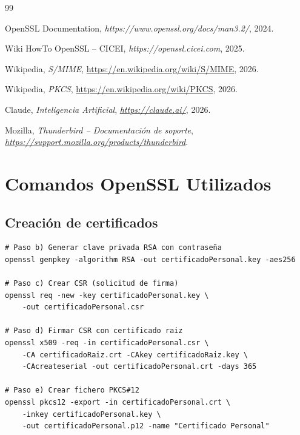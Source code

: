 \documentclass[12pt,a4paper]{report}
\begin{document}
\begin{thebibliography}{99}

 OpenSSL Documentation, \textit{https://www.openssl.org/docs/man3.2/}, 2024.

 Wiki HowTo OpenSSL -- CICEI, \textit{https://openssl.cicei.com}, 2025.

 Wikipedia, \textit{S/MIME}, \url{https://en.wikipedia.org/wiki/S/MIME}, 2026.

 Wikipedia, \textit{PKCS}, \url{https://en.wikipedia.org/wiki/PKCS}, 2026.

 Claude, \textit{Inteligencia Artificial}, \textit{\url{https://claude.ai/}}, 2026.

 Mozilla, \textit{Thunderbird -- Documentación de soporte}, \textit{\url{https://support.mozilla.org/products/thunderbird}}.

\end{thebibliography}


\appendix

\chapter{Comandos OpenSSL Utilizados}

\section{Creación de certificados}

\begin{lstlisting}[caption=Comandos para creación del certificado personal]
# Paso b) Generar clave privada RSA con contraseña
openssl genpkey -algorithm RSA -out certificadoPersonal.key -aes256

# Paso c) Crear CSR (solicitud de firma)
openssl req -new -key certificadoPersonal.key \
    -out certificadoPersonal.csr

# Paso d) Firmar CSR con certificado raiz
openssl x509 -req -in certificadoPersonal.csr \
    -CA certificadoRaiz.crt -CAkey certificadoRaiz.key \
    -CAcreateserial -out certificadoPersonal.crt -days 365

# Paso e) Crear fichero PKCS#12
openssl pkcs12 -export -in certificadoPersonal.crt \
    -inkey certificadoPersonal.key \
    -out certificadoPersonal.p12 -name "Certificado Personal"
\end{lstlisting}
\end{document}
